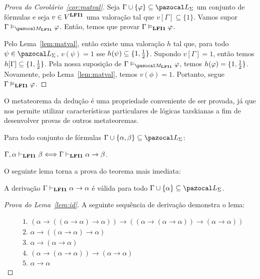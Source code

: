    \begin{proof}[Prova do Corolário~\ref{cor:matval}]
        Seja $\Gamma \cup \{\phi\} \subseteq \ling{}$ um conjunto de fórmulas e seja $v \in V^{{\normalfont\textbf{LFI1}}{}}$ uma valoração tal que $v[\Gamma] \subseteq \{1\}$. Vamos supor $\Gamma \conmat \phi$. Então, temos que provar $\Gamma \vDash_{{\normalfont\textbf{LFI1}}{}} \varphi$.

        Pelo Lema~\ref{lem:matval}, então existe uma valoração $h$ tal que, para todo $\psi \in \ling{}$, $v(\psi) = 1$ sse $h(\psi) \subseteq \{1, \frac{1}{2}{}\}$. Supondo $v[\Gamma] = 1$, então temos $h[\Gamma] \subseteq \{1,\frac{1}{2}{}\}$. Pela nossa suposição de $\Gamma \conmat \phi$, temos $h(\varphi) = \{1, \frac{1}{2}{}\}$. Novamente, pelo Lema~\ref{lem:matval}, temos $v(\phi) = 1$. Portanto, segue $\Gamma \vDash_{{\normalfont\textbf{LFI1}}{}} \varphi$.

    \end{proof}

    O metateorema da dedução é uma propriedade conveniente de ser provada, já que nos permite utilizar características particulares de lógicas tarskianas a fim de desenvolver provas de outros metateoremas.
    
    \begin{teorema}\label{teo:deducao}
        Para todo conjunto de fórmulas $\Gamma \cup \{\alpha, \beta \} \subseteq \ling{}$:

        \centering
        {\normalfont{} $\Gamma, \alpha \vdash_{{\normalfont\textbf{LFI1}}{}} \beta \Longleftrightarrow \Gamma \vdash_{{\normalfont\textbf{LFI1}}{}} \alpha \to \beta$.}
    \end{teorema}

    O seguinte lema torna a prova do teorema mais imediata:
    \begin{lema}\label{lem:id}
        A derivação $\Gamma \vdash_{{\normalfont\textbf{LFI1}}{}} \alpha \to \alpha$ é válida para todo $\Gamma \cup \{\alpha\} \subseteq \ling{}$.
    \end{lema}
    
    \begin{proof}[Prova do Lema~\ref{lem:id}]
        A seguinte sequência de derivação demonstra o lema:
        
        \begin{align*}
            & \text{1. } (\alpha \to ((\alpha \to \alpha) \to \alpha)) \to ((\alpha \to (\alpha \to \alpha)) \to (\alpha \to \alpha))\tag{Ax2}\\
            & \text{2. } \alpha \to ((\alpha \to \alpha) \to \alpha)\tag{Ax1}\\
            & \text{3. } \alpha \to (\alpha \to \alpha)\tag{Ax1}\\
            & \text{4. } (\alpha \to (\alpha \to \alpha)) \to (\alpha \to \alpha)\tag{MP 1,2}\\
            & \text{5. } \alpha \to \alpha\tag{MP 3,4}
        \end{align*}
    \end{proof}

